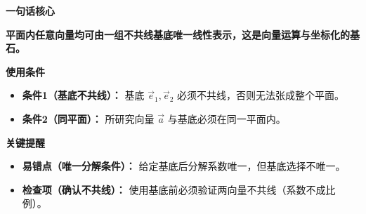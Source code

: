 \begin{summarybox}
	\textbf{\textcolor{CSummary}{一句话核心}}
	\par\textbf{平面内任意向量均可由一组不共线基底唯一线性表示，这是向量运算与坐标化的基石。}

	\medskip
	\textbf{\textcolor{CSummary}{使用条件}}
	\begin{itemize}[leftmargin=*, itemsep=0.5em, topsep=0.4em]
		\item \textbf{条件1（基底不共线）：} 基底 $\vec{e}_1,\vec{e}_2$ 必须不共线，否则无法张成整个平面。
		\item \textbf{条件2（同平面）：} 所研究向量 $\vec{a}$ 与基底必须在同一平面内。
	\end{itemize}

	\medskip
	\textbf{\textcolor{CSummary}{关键提醒}}
	\begin{itemize}[leftmargin=*, itemsep=0.5em, topsep=0.4em]
		\item \textbf{易错点（唯一分解条件）：} 给定基底后分解系数唯一，但基底选择不唯一。
		\item \textbf{检查项（确认不共线）：} 使用基底前必须验证两向量不共线（系数不成比例）。
	\end{itemize}

\end{summarybox}

